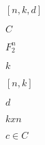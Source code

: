 \documentclass{article}
\begin{document}
$[n, k, d]$
\pagebreak

$C$
\pagebreak

$F^{n}_{2}$
\pagebreak

$k$
\pagebreak

$[n, k]$
\pagebreak

$d$
\pagebreak

$kxn$
\pagebreak

$c \in C$
\pagebreak
\end{document}
